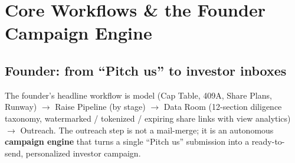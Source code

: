 \documentclass[11pt]{article}
\begin{document}
\section{Core Workflows \& the Founder Campaign Engine}
\subsection{Founder: from ``Pitch us'' to investor inboxes}
The founder's headline workflow is model (Cap Table, 409A, Share Plans, Runway)
$\to$ Raise Pipeline (by stage) $\to$ Data Room (12-section diligence taxonomy,
watermarked / tokenized / expiring share links with view analytics) $\to$ Outreach.
The outreach step is not a mail-merge; it is an autonomous \textbf{campaign engine}
that turns a single ``Pitch us'' submission into a ready-to-send, personalized
investor campaign.
\end{document}
